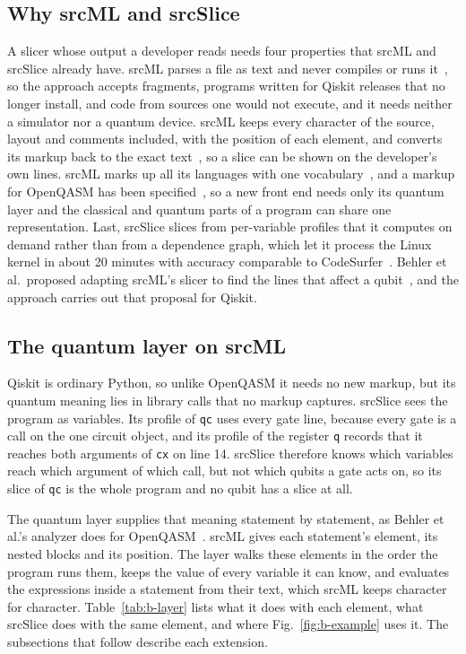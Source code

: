\subsection{Why srcML and srcSlice}
A slicer whose output a developer reads needs four properties that srcML and srcSlice already have. srcML parses a file
as text and never compiles or runs it~\cite{collard2011lightweight}, so the approach accepts fragments, programs
written for Qiskit releases that no longer install, and code from sources one would not execute, and it needs neither
a simulator nor a quantum device. srcML keeps every character of the source, layout and comments included, with the
position of each element, and converts its markup back to the exact text~\cite{collard2011lightweight}, so a slice can
be shown on the developer's own lines. srcML marks up all its languages with one vocabulary~\cite{collard2013srcml}, and
a markup for OpenQASM has been specified~\cite{behler2024supporting}, so a new front end needs only its quantum layer
and the classical and quantum parts of a program can share one representation. Last, srcSlice slices from per-variable
profiles that it computes on demand rather than from a dependence graph, which let it process the Linux kernel in about
20 minutes with accuracy comparable to CodeSurfer~\cite{alomari2014srcslice}. Behler et al.\ proposed adapting srcML's
slicer to find the lines that affect a qubit~\cite{behler2025static}, and the approach carries out that proposal for
Qiskit.

\subsection{The quantum layer on srcML}\label{sec:b-layer}
Qiskit is ordinary Python, so unlike OpenQASM it needs no new markup, but its quantum meaning lies in library calls that
no markup captures. srcSlice sees the program as variables. Its profile of \texttt{qc} uses every gate line, because
every gate is a call on the one circuit object, and its profile of the register \texttt{q} records that it reaches both
arguments of \texttt{cx} on line 14. srcSlice therefore knows which variables reach which argument of which call, but
not which qubits a gate acts on, so its slice of \texttt{qc} is the whole program and no qubit has a slice at all.

The quantum layer supplies that meaning statement by statement, as Behler et al.'s analyzer does for
OpenQASM~\cite{behler2024supporting}. srcML gives each statement's element, its nested blocks and its position. The
layer walks these elements in the order the program runs them, keeps the value of every variable it can know, and
evaluates the expressions inside a statement from their text, which srcML keeps character for character.
Table~\ref{tab:b-layer} lists what it does with each element, what srcSlice does with the same element, and where
Fig.~\ref{fig:b-example} uses it. The subsections that follow describe each extension.

